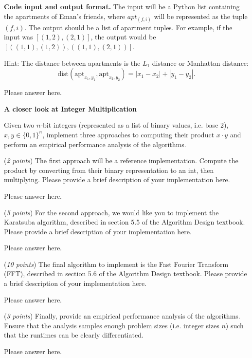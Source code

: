 \documentclass{hw_template}
\newcommand{\io}{\textbf{Code input and output format.} }
\begin{document}
\begin{problem}
  
  \io The input will be a Python list containing the apartments of Eman's friends, where $apt_{(f,i)}$ will be represented as the tuple $(f, i)$. The output should be a list of apartment tuples.
  For example, if the input was $[(1,2), (2,1)]$, the output would be $[((1,1), (1,2)), ((1,1), (2,1))]$.

  Hint: The distance between apartments is the $L_1$ distance or Manhattan distance:
  $$\text{dist}(\text{apt}_{x_1,y_1}, \text{apt}_{x_2,y_2}) = |x_1 - x_2| + |y_1 - y_2|.$$

  \begin{solution}
Please answer here.
\end{solution}
  
\end{problem}

\begin{challenge}
    \textbf{A closer look at Integer Multiplication}
    
    Given two $n$-bit integers (represented as a list of binary values, i.e. base 2), $x, y\in\{0,1\}^n$,
    implement three approaches to computing their product $x \cdot y$
    and perform an empirical performance analysis of the algorithms.

    (\textit{2 points}) The first approach will be a reference implementation. Compute the product by converting from their binary representation to an int, then multiplying. Please provide a brief description of your implementation here.
    
    \begin{solution}
        Please answer here.
    \end{solution}

    (\textit{5 points}) For the second approach,
    we would like you to implement the Karatsuba algorithm,
    described in section 5.5 of the Algorithm Design textbook.
    Please provide a brief description of your implementation here.

    \begin{solution}
        Please answer here.
    \end{solution}

    (\textit{10 points}) The final algorithm to implement is the Fast Fourier Transform (FFT), described in
    section 5.6 of the Algorithm Design textbook.
    Please provide a brief description of your implementation here.

    \begin{solution}
        Please answer here.
    \end{solution}


    (\textit{3 points}) Finally, provide an empirical performance analysis of the algorithms.
    Ensure that the analysis samples enough problem sizes (i.e. integer sizes $n$)
    such that the runtimes can be clearly differentiated.
    
    \begin{solution}
        Please answer here.
    \end{solution}

\end{challenge}
\end{document}
